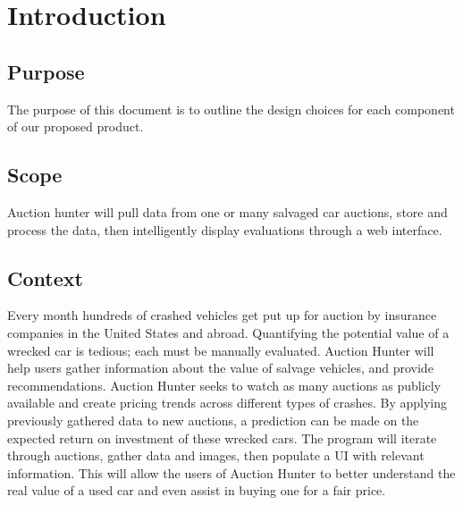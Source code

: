 \documentclass[onecolumn, draftclsnofoot, 10pt, compsoc]{IEEEtran}
\begin{document}
\newpage
\tableofcontents
\newpage

\section{Introduction}
\subsection{Purpose}
The purpose of this document is to outline the design choices for each component of our proposed product. 
\subsection{Scope}
Auction hunter will pull data from one or many salvaged car auctions, store and process the data, then intelligently display evaluations through a web interface. 
\subsection{Context}
Every month hundreds of crashed vehicles get put up for auction by insurance companies in the United States and abroad. Quantifying the potential value of a wrecked car is tedious; each must be manually evaluated. Auction Hunter will help users gather information about the value of salvage vehicles, and provide recommendations. Auction Hunter seeks to watch as many auctions as publicly available and create pricing trends across different types of crashes. By applying previously gathered data to new auctions, a prediction can be made on the expected return on investment of these wrecked cars. The program will iterate through auctions, gather data and images, then populate a UI with relevant information. This will allow the users of Auction Hunter to better understand the real value of a used car and even assist in buying one for a fair price.
\end{document}
